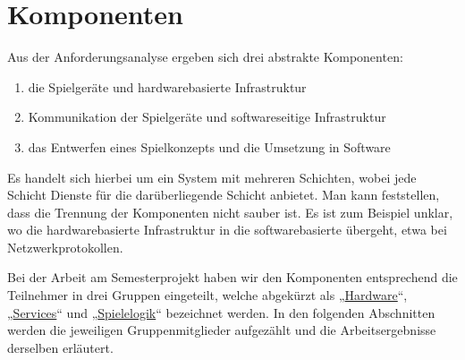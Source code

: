 \section{Komponenten}

Aus der Anforderungsanalyse ergeben sich drei abstrakte Komponenten:
\begin{enumerate}
  \item
    die Spielgeräte und hardwarebasierte Infrastruktur
  \item
    Kommunikation der Spielgeräte und softwareseitige Infrastruktur
  \item
    das Entwerfen eines Spielkonzepts und die Umsetzung in Software
\end{enumerate}
Es handelt sich hierbei um ein System mit mehreren Schichten, wobei jede Schicht Dienste für die
darüberliegende Schicht anbietet.
Man kann feststellen, dass die Trennung der Komponenten nicht sauber ist.
Es ist zum Beispiel unklar, wo die hardwarebasierte Infrastruktur in die softwarebasierte übergeht,
etwa bei Netzwerkprotokollen.

Bei der Arbeit am Semesterprojekt haben wir den Komponenten entsprechend die Teilnehmer in drei
Gruppen eingeteilt, welche abgekürzt als „\hyperref[hardware]{Hardware}“,
„\hyperref[services]{Services}“ und „\hyperref[spielelogik]{Spielelogik}“ bezeichnet werden.
In den folgenden Abschnitten werden die jeweiligen Gruppenmitglieder aufgezählt und die
Arbeitsergebnisse derselben erläutert.






